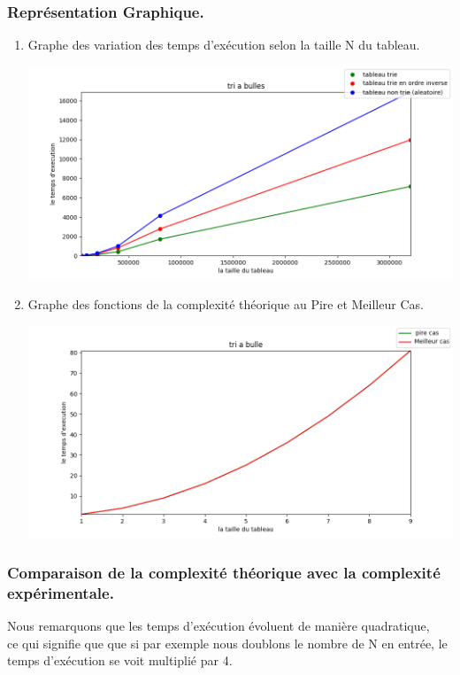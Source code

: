 \documentclass[12pt]{article}
\begin{document}
\subsubsection{Représentation Graphique.}
\begin{enumerate}
	\item Graphe des variation des temps d'exécution selon la taille N du tableau.

	\includegraphics[width=1\textwidth]{graph/tri_bulles.png}
	
	
	\item Graphe des fonctions de la complexité théorique au Pire et Meilleur Cas.
	
	\includegraphics[width=1\textwidth]{graph/tri_bulle_teorique.png}
	
\end{enumerate}

\subsubsection{Comparaison de la complexité théorique avec la complexité expérimentale.}

  Nous remarquons que les temps d'exécution évoluent de manière quadratique, \\
  ce qui signifie que que si par exemple nous doublons le nombre de N en entrée, le temps d'exécution se voit multiplié par 4. \\
\end{document}
